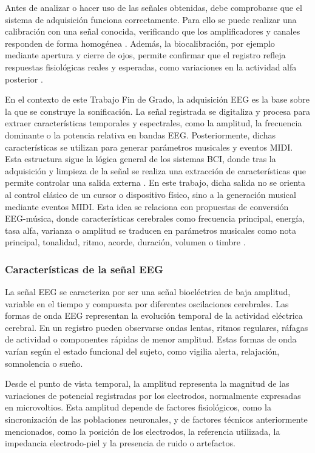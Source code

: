 \documentclass[../main.tex]{subfiles}
\begin{document}
Antes de analizar o hacer uso de las señales obtenidas, debe comprobarse que el sistema de adquisición funciona correctamente. Para ello se puede realizar una calibración con una señal conocida, verificando que los amplificadores y canales responden de forma homogénea \cite{StLouisFrey2016}. Además, la biocalibración, por ejemplo mediante apertura y cierre de ojos, permite confirmar que el registro refleja respuestas fisiológicas reales y esperadas, como variaciones en la actividad alfa posterior \cite{StLouisFrey2016}.

En el contexto de este Trabajo Fin de Grado, la adquisición EEG es la base sobre la que se construye la sonificación. La señal registrada se digitaliza y procesa para extraer características temporales y espectrales, como la amplitud, la frecuencia dominante o la potencia relativa en bandas EEG. Posteriormente, dichas características se utilizan para generar parámetros musicales y eventos MIDI. Esta estructura sigue la lógica general de los sistemas BCI, donde tras la adquisición y limpieza de la señal se realiza una extracción de características que permite controlar una salida externa \cite{Palaniappan2014}. En este trabajo, dicha salida no se orienta al control clásico de un cursor o dispositivo físico, sino a la generación musical mediante eventos MIDI. Esta idea se relaciona con propuestas de conversión EEG-música, donde características cerebrales como frecuencia principal, energía, tasa alfa, varianza o amplitud se traducen en parámetros musicales como nota principal, tonalidad, ritmo, acorde, duración, volumen o timbre \cite{Wu2010}.

\subsubsection{Características de la señal EEG}

La señal EEG se caracteriza por ser una señal bioeléctrica de baja amplitud, variable en el tiempo y compuesta por diferentes oscilaciones cerebrales. Las formas de onda EEG representan la evolución temporal de la actividad eléctrica cerebral. En un registro pueden observarse ondas lentas, ritmos regulares, ráfagas de actividad o componentes rápidas de menor amplitud. Estas formas de onda varían según el estado funcional del sujeto, como vigilia alerta, relajación, somnolencia o sueño.

Desde el punto de vista temporal, la amplitud representa la magnitud de las variaciones de potencial registradas por los electrodos, normalmente expresadas en microvoltios. Esta amplitud depende de factores fisiológicos, como la sincronización de las poblaciones neuronales, y de factores técnicos anteriormente mencionados, como la posición de los electrodos, la referencia utilizada, la impedancia electrodo-piel y la presencia de ruido o artefactos.
\end{document}
